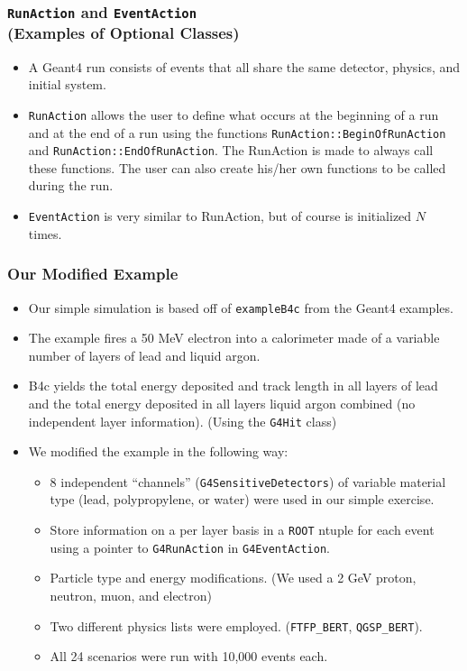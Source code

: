 \documentclass[mathserif,18pt,xcolor=table]{beamer}
\begin{document}
\begin{frame}
  \frametitle{\texttt{RunAction} and \texttt{EventAction}\\(Examples of Optional Classes)}
  \begin{itemize}
  \item A Geant4 run consists of events that all share the same detector, physics, and initial system.
  \item \texttt{RunAction} allows the user to define what occurs at the beginning of a run and at the end of a run using the functions \texttt{RunAction::BeginOfRunAction} and \texttt{RunAction::EndOfRunAction}. The RunAction is made to always call these functions. The user can also create his/her own functions to be called during the run.
  \item \texttt{EventAction} is very similar to RunAction, but of course is initialized $N$ times. 
  \end{itemize}
\end{frame}

\begin{frame}
  \frametitle{Our Modified Example}
  {\footnotesize
  \begin{itemize}
  \item Our simple simulation is based off of \texttt{exampleB4c} from the Geant4 examples.
  \item The example fires a 50 MeV electron into a calorimeter made of a variable number of layers of lead and liquid argon.
  \item B4c yields the total energy deposited and track length in all layers of lead and the total energy deposited in all layers liquid argon combined (no independent layer information). (Using the \texttt{G4Hit} class)
  \item We modified the example in the following way:
    \begin{itemize}
    \item 8 independent ``channels'' (\texttt{G4SensitiveDetectors}) of variable material type (lead, polypropylene, or water) were used in our simple exercise.
    \item Store information on a per layer basis in a \texttt{ROOT} ntuple for each event using a pointer to \texttt{G4RunAction} in \texttt{G4EventAction}.
    \item Particle type and energy modifications. (We used a 2 GeV proton, neutron, muon, and electron)
    \item Two different physics lists were employed. (\texttt{FTFP\_BERT}, \texttt{QGSP\_BERT}).
    \item All 24 scenarios were run with 10,000 events each.
    \end{itemize}
  \end{itemize}}
\end{frame}
\end{document}
